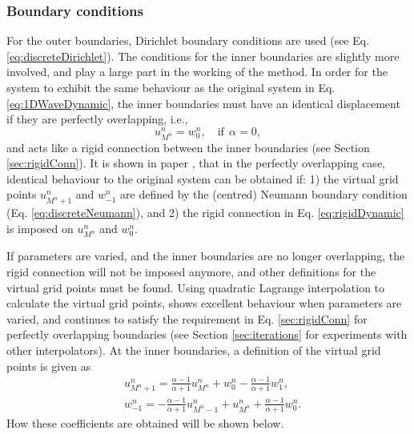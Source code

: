 \subsubsection{Boundary conditions}
For the outer boundaries, Dirichlet boundary conditions are used (see Eq. \eqref{eq:discreteDirichlet}).
The conditions for the inner boundaries are slightly more involved, and play a large part in the working of the method. 
In order for the system to exhibit the same behaviour as the original system in Eq. \eqref{eq:1DWaveDynamic}, the inner boundaries must have an identical displacement if they are perfectly overlapping, i.e.,
\begin{equation}\label{eq:rigidDynamic}
    u_{M^n}^n = w_0^n, \quad \text{if}\ \ \alpha = 0,
\end{equation}
and acts like a rigid connection between the inner boundaries (see Section \ref{sec:rigidConn}). It is shown in paper \citeP[G], that in the perfectly overlapping case, identical behaviour to the original system can be obtained if: 1) the virtual grid points $u_{M^n+1}^n$ and $w_{-1}^n$ are defined by the (centred) Neumann boundary condition (Eq. \eqref{eq:discreteNeumann}), and 2) the rigid connection in Eq. \eqref{eq:rigidDynamic} is imposed on $u_{M^n}^n$ and $w_0^n$. 

If parameters are varied, and the inner boundaries are no longer overlapping, the rigid connection will not be imposed anymore, and other definitions for the virtual grid points must be found. Using quadratic Lagrange interpolation to calculate the virtual grid points, shows excellent behaviour when parameters are varied, and continues to satisfy the requirement in Eq. \eqref{sec:rigidConn} for perfectly overlapping boundaries (see Section \ref{sec:iterations} for experiments with other interpolators). At the inner boundaries, a definition of the virtual grid points is given as
\begin{subequations}\label{eq:connectionInterpol}
    \begin{align}
            &u_{M^n+1}^n = \frac{\alpha - 1}{\alpha + 1}u_{M^n}^n + w_0^n - \frac{\alpha - 1}{\alpha + 1}w_1^n,
        \label{eq:calcUMP1}\\
            &w_{-1}^n = -\frac{\alpha - 1}{\alpha + 1}u_{M^n-1}^n + u_{M^n}^n+ \frac{\alpha - 1}{\alpha + 1}w_{0}^n.\label{eq:calcWM1}
    \end{align}
\end{subequations}
How these coefficients are obtained will be shown below. 

